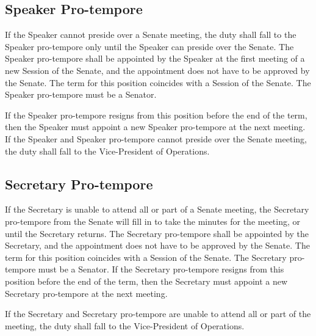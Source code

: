 \documentclass[12pt]{scrreprt}
\begin{document}
\subsection{Speaker Pro-tempore}
If the Speaker cannot preside over a Senate meeting, the duty shall fall to the Speaker
pro-tempore only until the Speaker can preside over the Senate. The Speaker pro-tempore shall
be appointed by the Speaker at the first meeting of a new Session of the Senate, and the
appointment does not have to be approved by the Senate. The term for this position coincides
with a Session of the Senate. The Speaker pro-tempore must be a Senator. 

If the Speaker
pro-tempore resigns from this position before the end of the term, then the Speaker must
appoint a new Speaker pro-tempore at the next meeting.
If the Speaker and Speaker pro-tempore cannot preside over the Senate meeting, the duty shall
fall to the Vice-President of Operations.

\subsection{Secretary Pro-tempore}
If the Secretary is unable to attend all or part of a Senate meeting, the Secretary pro-tempore
from the Senate will fill in to take the minutes for the meeting, or until the Secretary returns. The
Secretary pro-tempore shall be appointed by the Secretary, and the appointment does not have
to be approved by the Senate. The term for this position coincides with a Session of the Senate.
The Secretary pro-tempore must be a Senator. If the Secretary pro-tempore resigns from this
position before the end of the term, then the Secretary must appoint a new Secretary
pro-tempore at the next meeting.

If the Secretary and Secretary pro-tempore are unable to attend all or part of the meeting, the
duty shall fall to the Vice-President of Operations.
\end{document}
